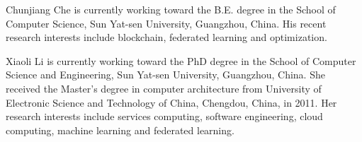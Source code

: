 \documentclass[10pt,journal,compsoc]{IEEEtran}
\begin{document}



% 

\begin{IEEEbiography}
 {Chunjiang Che} is currently working toward the B.E. degree in the School of Computer Science, Sun Yat-sen University, Guangzhou, China. His recent research interests include blockchain, federated learning and optimization.
\end{IEEEbiography}
\begin{IEEEbiography}
 {Xiaoli Li} is currently working toward the PhD degree in the School of Computer Science and Engineering, Sun Yat-sen University, Guangzhou, China. She received the Master's degree in computer architecture from University of Electronic Science and Technology of China, Chengdou, China, in 2011. Her research interests include services computing, software engineering, cloud computing, machine learning and federated learning.
\end{IEEEbiography}
\end{document}
